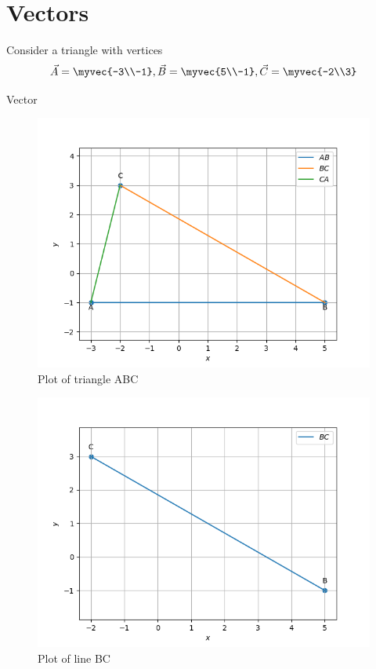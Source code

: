 \documentclass[journal,12pt,twocolumn]{IEEEtran}
\theoremstyle{remark}
\begin{document}
\section{Vectors}
Consider a triangle with vertices
$$\vec{A}=\myvec{-3\\-1}, 
\vec{B}=\myvec{5\\-1}, 
\vec{C}=\myvec{-2\\3}$$

\begin{table}[!ht]
	
	\caption{Vector}
	\label{tab:vectors}	
\end{table}

\begin{figure}[!ht]
              \centering
              \includegraphics[width=\columnwidth]{./figs/fig1.1.3.png}
              \caption{Plot of triangle ABC}
              \label{fig:1}
\end{figure}
\begin{figure}[!ht]
              \centering
              \includegraphics[width=\columnwidth]{./figs/fig1.1.5.png}
              \caption{Plot of line BC}
              \label{fig:2}
\end{figure}
\end{document}
